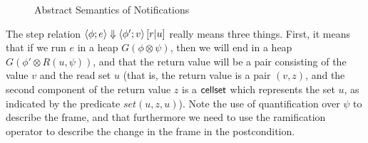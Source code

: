 \documentclass[natbib]{sigplanconf}
\begin{document}
\begin{figure}
{\small
{}
}
\caption{Abstract Semantics of Notifications}
\label{abs-semantics}
\end{figure}



The step relation $\left<{\phi};{e}\right>\Downarrow\left<{\phi'};{v}\right>\left[{r}|{u}\right]$ really means three
things. First, it means that if we run $e$ in a heap $G(\phi \otimes
\psi)$, then we will end in a heap $G(\phi' \otimes R(u, \psi))$, and
that the return value will be a pair consisting of the value $v$ and
the read set $u$ (that is, the return value is a pair $(v,z)$, and the
second component of the return value $z$ is a $\mbox{\textsf{{cellset}}}$ which
represents the set $u$, as indicated by the predicate $set(u, z, u)$).
Note the use of quantification over $\psi$ to describe the frame, and
that furthermore we need to use the ramification operator to describe
the change in the frame in the postcondition. 
\end{document}
